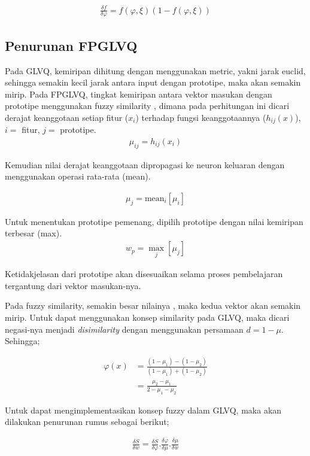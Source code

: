 \begin{align}
\label{eq:deltasigmoid}
	\frac{\delta f}{\delta \varphi} = f(\varphi, \xi) (1 - f(\varphi , 
	\xi))
\end{align}
	
	
\subsection{Penurunan FPGLVQ}
Pada GLVQ, kemiripan dihitung dengan menggunakan metric, yakni jarak euclid,
sehingga semakin kecil jarak antara input dengan prototipe, maka akan semakin
mirip. Pada FPGLVQ, tingkat kemiripan antara vektor masukan dengan prototipe
menggunakan fuzzy similarity , dimana pada perhitungan ini dicari
derajat keanggotaan setiap fitur ($x_i$) terhadap fungsi keanggotaannya
($h_{ij}(x)$), $i=$ fitur, $j=$ prototipe.
\begin{align}
	\mu_{ij} = h_{ij}(x_i)
\end{align}

Kemudian nilai derajat keanggotaan dipropagasi ke neuron keluaran dengan
menggunakan operasi rata-rata (mean). 

\begin{align}
	\mu_j = \text{mean}_i [\mu_i]
\end{align}

Untuk menentukan prototipe pemenang, dipilih prototipe dengan nilai kemiripan
terbesar (max).  
\begin{align}
	w_p = \max_j [\mu_j]
\end{align}

Ketidakjelasan dari prototipe akan disesuaikan selama proses pembelajaran
tergantung dari vektor masukan-nya.

Pada fuzzy similarity, semakin besar nilainya , maka kedua vektor akan semakin
mirip. Untuk dapat menggunakan konsep similarity pada GLVQ, maka dicari
negasi-nya menjadi \textit{disimilarity} dengan menggunakan persamaan $d = 1 -
\mu$. Sehingga;

\begin{align}
\label{eq:}
	\varphi(x) &= \frac{(1 - \mu_1) - (1 - \mu_2)}{(1 - \mu_1) + (1 -
	\mu_2)}\nonumber\\
	&= \frac{\mu_2 - \mu_1}{2 - \mu_1 - \mu_2}
\end{align}

Untuk dapat mengimplementasikan konsep fuzzy dalam GLVQ, maka akan dilakukan
penurunan rumus sebagai berikut;

\begin{align}
\label{eq:}
	\frac{\delta S}{\delta w} =  
	\frac{\delta S}{\delta \varphi} . \frac{\delta \varphi}{\delta \mu}.
	\frac{\delta \mu}{\delta w}
\end{align}

